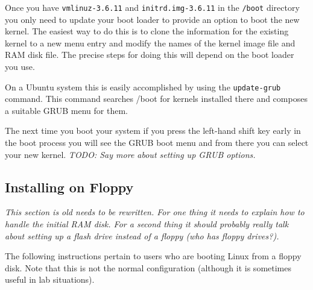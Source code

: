 \documentclass{article}
\newcommand{\command}[1]{\texttt{#1}}    %
\newcommand{\filename}[1]{\texttt{#1}}   %
\newcommand{\todo}[1]{\textit{TODO: #1}}
\begin{document}
Once you have \filename{vmlinuz-3.6.11} and \filename{initrd.img-3.6.11} in the
\filename{/boot} directory you only need to update your boot loader to provide an option to boot
the new kernel. The easiest way to do this is to clone the information for the existing kernel
to a new menu entry and modify the names of the kernel image file and RAM disk file. The precise
steps for doing this will depend on the boot loader you use.

On a Ubuntu system this is easily accomplished by using the \command{update-grub} command. This
command searches /boot for kernels installed there and composes a suitable GRUB menu for them.

The next time you boot your system if you press the left-hand shift key early in the boot
process you will see the GRUB boot menu and from there you can select your new kernel. \todo{Say
  more about setting up GRUB options.}

\subsection{Installing on Floppy}

\textit{This section is old needs to be rewritten. For one thing it needs to explain how to
  handle the initial RAM disk. For a second thing it should probably really talk about setting
  up a flash drive instead of a floppy (who has floppy drives?).}

The following instructions pertain to users who are booting Linux from a floppy disk. Note that
this is not the normal configuration (although it is sometimes useful in lab situations).
\end{document}
